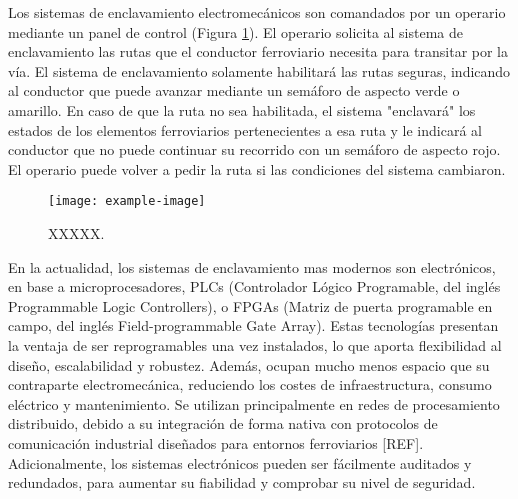     Los sistemas de enclavamiento electromecánicos son comandados por un operario mediante un panel de control (Figura \ref{fig:enclavamiento_3}). El operario solicita al sistema de enclavamiento las rutas que el conductor ferroviario necesita para transitar por la vía. El sistema de enclavamiento solamente habilitará las rutas seguras, indicando al conductor que puede avanzar mediante un semáforo de aspecto verde o amarillo. En caso de que la ruta no sea habilitada, el sistema "enclavará" los estados de los elementos ferroviarios pertenecientes a esa ruta y le indicará al conductor que no puede continuar su recorrido con un semáforo de aspecto rojo. El operario puede volver a pedir la ruta si las condiciones del sistema cambiaron.
    
    \begin{figure}[h]
        \centering
        \texttt{[image: example-image]}
        \centering\caption{XXXXX.}
        \label{fig:enclavamiento_3}
    \end{figure}

    En la actualidad, los sistemas de enclavamiento mas modernos son electrónicos, en base a microprocesadores, PLCs (Controlador Lógico Programable, del inglés Programmable Logic Controllers), o FPGAs (Matriz de puerta programable en campo, del inglés Field-programmable Gate Array). Estas tecnologías presentan la ventaja de ser reprogramables una vez instalados, lo que aporta flexibilidad al diseño, escalabilidad y robustez. Además, ocupan mucho menos espacio que su contraparte electromecánica, reduciendo los costes de infraestructura, consumo eléctrico y mantenimiento. Se utilizan principalmente en redes de procesamiento distribuido, debido a su integración de forma nativa con protocolos de comunicación industrial diseñados para entornos ferroviarios [REF]. Adicionalmente, los sistemas electrónicos pueden ser fácilmente auditados y redundados, para aumentar su fiabilidad y comprobar su nivel de seguridad.
